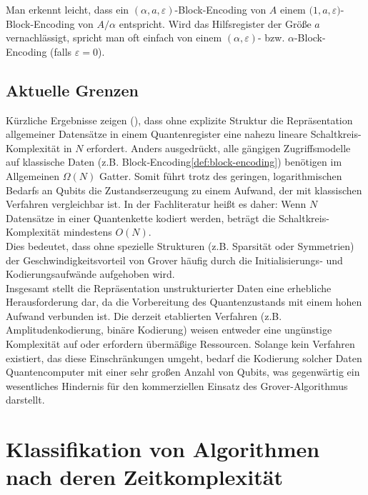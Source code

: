 \begin{enumerate}
    Man erkennt leicht, dass ein \((\alpha,a,\varepsilon)\)-Block-Encoding von \(A\) einem  
    \(\bigl(1,a,\varepsilon\bigr)\)-Block-Encoding von \(A/\alpha\) entspricht. Wird das Hilfsregister der Größe \(a\) vernachlässigt, spricht man oft einfach von einem \((\alpha,\varepsilon)\)- bzw. \(\alpha\)-Block-Encoding (falls \(\varepsilon=0\)).  
\end{enumerate}  

\subsection{Aktuelle Grenzen}
Kürzliche Ergebnisse zeigen (\cite{zhang_xiao-ming_circuit_2024}), dass ohne explizite Struktur die Repräsentation allgemeiner Datensätze in einem Quantenregister eine nahezu lineare Schaltkreis-Komplexität in \(N\) erfordert. Anders ausgedrückt, alle gängigen Zugriffsmodelle auf klassische Daten (z.B. Block‑Encoding\ref{def:block-encoding}) benötigen im Allgemeinen \(\Omega(N)\) Gatter. Somit führt trotz des geringen, logarithmischen Bedarfs an Qubits die Zustandserzeugung zu einem Aufwand, der mit klassischen Verfahren vergleichbar ist. In der Fachliteratur heißt es daher: 
Wenn \(N\) Datensätze in einer Quantenkette kodiert werden, beträgt die Schaltkreis-Komplexität mindestens \(O(N)\).\\

Dies bedeutet, dass ohne spezielle Strukturen (z.B. Sparsität oder Symmetrien) der Geschwindigkeitsvorteil von Grover häufig durch die Initialisierungs‑ und Kodierungsaufwände aufgehoben wird.\\

Insgesamt stellt die Repräsentation unstrukturierter Daten eine erhebliche Herausforderung dar, da die Vorbereitung des Quantenzustands mit einem hohen Aufwand verbunden ist. Die derzeit etablierten Verfahren (z.B. Amplitudenkodierung, binäre Kodierung) weisen entweder eine ungünstige Komplexität auf oder erfordern übermäßige Ressourcen. Solange kein Verfahren existiert, das diese Einschränkungen umgeht, bedarf die Kodierung solcher Daten Quantencomputer mit einer sehr großen Anzahl von Qubits, was gegenwärtig ein wesentliches Hindernis für den kommerziellen Einsatz des Grover-Algorithmus darstellt.

\section{Klassifikation von Algorithmen nach deren Zeitkomplexität}

